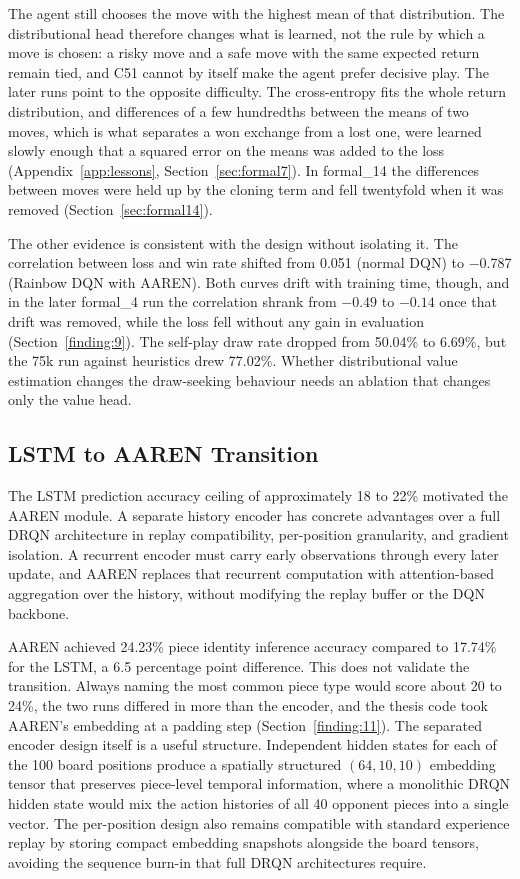 The agent still chooses the move with the highest mean of that distribution. The distributional head therefore changes what is learned, not the rule by which a move is chosen: a risky move and a safe move with the same expected return remain tied, and C51 cannot by itself make the agent prefer decisive play. The later runs point to the opposite difficulty. The cross-entropy fits the whole return distribution, and differences of a few hundredths between the means of two moves, which is what separates a won exchange from a lost one, were learned slowly enough that a squared error on the means was added to the loss (Appendix~\ref{app:lessons}, Section~\ref{sec:formal7}). In formal\_14 the differences between moves were held up by the cloning term and fell twentyfold when it was removed (Section~\ref{sec:formal14}).

The other evidence is consistent with the design without isolating it. The correlation between loss and win rate shifted from 0.051 (normal DQN) to $-$0.787 (Rainbow DQN with AAREN). Both curves drift with training time, though, and in the later formal\_4 run the correlation shrank from $-0.49$ to $-0.14$ once that drift was removed, while the loss fell without any gain in evaluation (Section~\ref{finding:9}). The self-play draw rate dropped from 50.04\% to 6.69\%, but the 75k run against heuristics drew 77.02\%. Whether distributional value estimation changes the draw-seeking behaviour needs an ablation that changes only the value head.

\subsection{LSTM to AAREN Transition}

The LSTM prediction accuracy ceiling of approximately 18 to 22\% motivated the AAREN module. A separate history encoder has concrete advantages over a full DRQN architecture in replay compatibility, per-position granularity, and gradient isolation. A recurrent encoder must carry early observations through every later update, and AAREN replaces that recurrent computation with attention-based aggregation over the history, without modifying the replay buffer or the DQN backbone.

AAREN achieved 24.23\% piece identity inference accuracy compared to 17.74\% for the LSTM, a 6.5 percentage point difference. This does not validate the transition. Always naming the most common piece type would score about 20 to 24\%, the two runs differed in more than the encoder, and the thesis code took AAREN's embedding at a padding step (Section~\ref{finding:11}). The separated encoder design itself is a useful structure. Independent hidden states for each of the 100 board positions produce a spatially structured $(64, 10, 10)$ embedding tensor that preserves piece-level temporal information, where a monolithic DRQN hidden state would mix the action histories of all 40 opponent pieces into a single vector. The per-position design also remains compatible with standard experience replay by storing compact embedding snapshots alongside the board tensors, avoiding the sequence burn-in that full DRQN architectures require.

